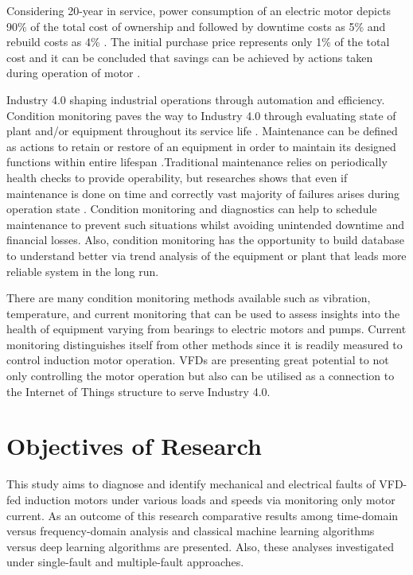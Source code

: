 Considering 20-year in service, power consumption of an electric motor depicts 90\% of the total cost of ownership and followed by downtime costs as 5\% and rebuild costs as 4\% \cite{waide2011energy}. The initial purchase price represents only 1\% of the total cost and it can be concluded that savings can be achieved by actions taken during operation of motor \cite{waide2011energy}.

Industry 4.0 shaping industrial operations through automation and efficiency. Condition monitoring paves the way to Industry 4.0 through evaluating state of plant and/or equipment throughout its service life \cite{en201713306}. Maintenance can be defined as actions to retain or restore of an equipment in order to maintain its designed functions within entire lifespan \cite{en201713306}.Traditional maintenance relies on periodically health checks to provide operability, but researches shows that even if maintenance is done on time and correctly vast majority of failures arises during operation state \cite{motor1985report}. Condition monitoring and diagnostics can help to schedule maintenance to prevent such situations whilst avoiding unintended downtime and financial losses. Also, condition monitoring has the opportunity to build database to understand better via trend analysis of the equipment or plant that leads more reliable system in the long run. 

There are many condition monitoring methods available such as vibration, temperature, and current monitoring that can be used to assess insights into the health of equipment varying from bearings to electric motors and pumps. Current monitoring distinguishes itself from other methods since it is readily measured to control induction motor operation. VFDs are presenting great potential to not only controlling the motor operation but also can be utilised as a connection to the Internet of Things structure to serve Industry 4.0.

\section{Objectives of Research}
\label{objectives}

This study aims to diagnose and identify mechanical and electrical faults of VFD-fed induction motors under various loads and speeds via monitoring only motor current. As an outcome of this research comparative results among time-domain versus frequency-domain analysis and classical machine learning algorithms versus deep learning algorithms are presented. Also, these analyses investigated under single-fault and multiple-fault approaches.

